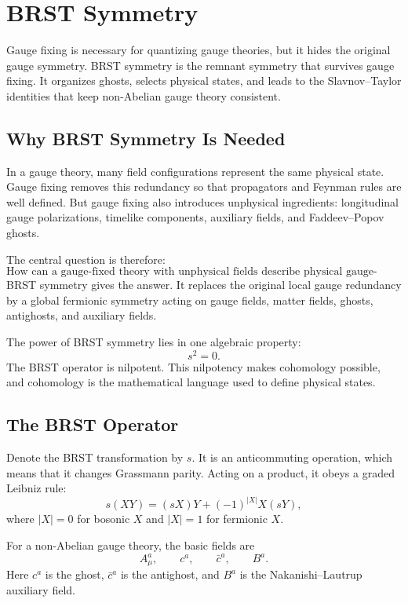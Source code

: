 \chapter{BRST Symmetry}

\begin{remarkbox}
Gauge fixing is necessary for quantizing gauge theories, but it hides the
original gauge symmetry. BRST symmetry is the remnant symmetry that survives
gauge fixing. It organizes ghosts, selects physical states, and leads to the
Slavnov--Taylor identities that keep non-Abelian gauge theory consistent.
\end{remarkbox}

\section{Why BRST Symmetry Is Needed}

In a gauge theory, many field configurations represent the same physical state.
Gauge fixing removes this redundancy so that propagators and Feynman rules are
well defined. But gauge fixing also introduces unphysical ingredients:
longitudinal gauge polarizations, timelike components, auxiliary fields, and
Faddeev--Popov ghosts.

The central question is therefore:
\[
    \text{How can a gauge-fixed theory with unphysical fields describe physical
    gauge-invariant observables?}
\]
BRST symmetry gives the answer. It replaces the original local gauge redundancy
by a global fermionic symmetry acting on gauge fields, matter fields, ghosts,
antighosts, and auxiliary fields.

The power of BRST symmetry lies in one algebraic property:
\[
    s^2=0.
\]
The BRST operator is nilpotent. This nilpotency makes cohomology possible, and
cohomology is the mathematical language used to define physical states.

\section{The BRST Operator}

Denote the BRST transformation by \(s\). It is an anticommuting operation, which
means that it changes Grassmann parity. Acting on a product, it obeys a graded
Leibniz rule:
\[
    s(XY)=(sX)Y+(-1)^{|X|}X(sY),
\]
where \(|X|=0\) for bosonic \(X\) and \(|X|=1\) for fermionic \(X\).

For a non-Abelian gauge theory, the basic fields are
\[
    A_\mu^a,
    \qquad
    c^a,
    \qquad
    \bar c^a,
    \qquad
    B^a.
\]
Here \(c^a\) is the ghost, \(\bar c^a\) is the antighost, and \(B^a\) is the
Nakanishi--Lautrup auxiliary field.

